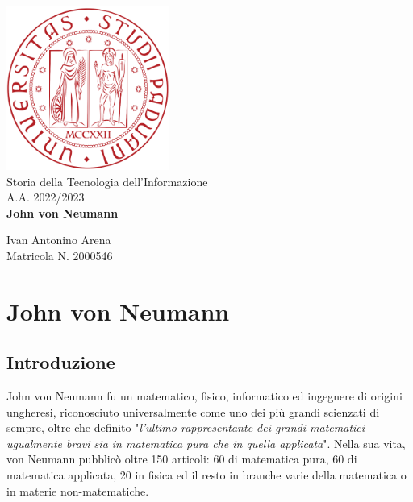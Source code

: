 \documentclass[a4paper, 12pt]{article}
\begin{document}
\begin{titlepage}
\begin{center}

\includegraphics[width=0.4\textwidth]{logo.png}\\[1cm]

{\large Storia della Tecnologia dell'Informazione \\ A.A. 2022/2023}\\[2cm]

{ \huge \bfseries John von Neumann \\[1cm] } %

{\large Ivan Antonino Arena \\ Matricola N. 2000546} %
\end{center}
\end{titlepage}

\tableofcontents %
\clearpage %

\section{John von Neumann}

\subsection{Introduzione}

John von Neumann fu un matematico, fisico, informatico ed ingegnere di origini ungheresi, riconosciuto universalmente come uno dei più grandi scienzati di sempre, oltre che definito "\textit{l'ultimo rappresentante dei grandi matematici ugualmente bravi sia in matematica pura che in quella applicata}". Nella sua vita, von Neumann pubblicò oltre 150 articoli: 60 di matematica pura, 60 di matematica applicata, 20 in fisica ed il resto in branche varie della matematica o in materie non-matematiche.
\end{document}
